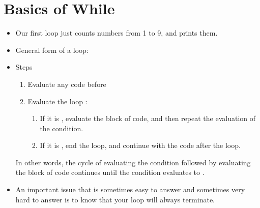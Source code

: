 \documentclass[letterpaper,10pt,english]{sphinxmanual}
\begin{document}
\section{Basics of While}
\label{\detokenize{lecture_notes/lec09_loops1_while:basics-of-while}}\begin{itemize}
\item {} 
Our first  loop just counts numbers from 1 to 9, and prints them.

%
\begin{sphinxVerbatim}[commandchars=\\\{\}]
 
         
\end{sphinxVerbatim}

\item {} 
General form of a  loop:

%
\begin{sphinxVerbatim}[commandchars=\\\{\}]
 
\end{sphinxVerbatim}

\item {} 
Steps
\begin{enumerate}
\item {} 
Evaluate any code before 

\item {} 
Evaluate the  loop :
\begin{enumerate}
\item {} 
If it is , evaluate the block of code, and then repeat
the evaluation of the condition.

\item {} 
If it is , end the loop, and continue with the code
after the loop.

\end{enumerate}

\end{enumerate}

In other words, the cycle of evaluating the condition followed by
evaluating the block of code continues until the condition evaluates
to .

\item {} 
An important issue that is sometimes easy to answer and sometimes
very hard to answer is to know that your loop will always
terminate.

\end{itemize}
\end{document}
